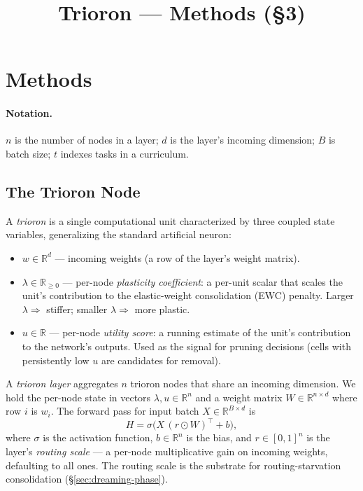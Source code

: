 \documentclass[11pt]{article}
\title{Trioron --- Methods (\S3)}
\author{}
\date{}
\newcommand{\R}{\mathbb{R}}
\begin{document}
\maketitle

\section{Methods}
\label{sec:methods}

\paragraph{Notation.}
$n$ is the number of nodes in a layer; $d$ is the layer's incoming
dimension; $B$ is batch size; $t$ indexes tasks in a curriculum.

\subsection{The Trioron Node}
\label{sec:trioron-node}

A \emph{trioron} is a single computational unit characterized by three
coupled state variables, generalizing the standard artificial neuron:

\begin{itemize}[leftmargin=1.5em]
  \item $w \in \R^{d}$ --- incoming weights (a row of the layer's weight
        matrix).
  \item $\lambda \in \R_{\geq 0}$ --- per-node \emph{plasticity coefficient}:
        a per-unit scalar that scales the unit's contribution to the
        elastic-weight consolidation (EWC) penalty. Larger
        $\lambda \Rightarrow$ stiffer; smaller $\lambda \Rightarrow$ more
        plastic.
  \item $u \in \R$ --- per-node \emph{utility score}: a running estimate
        of the unit's contribution to the network's outputs. Used as the
        signal for pruning decisions (cells with persistently low $u$ are
        candidates for removal).
\end{itemize}

A \emph{trioron layer} aggregates $n$ trioron nodes that share an incoming
dimension. We hold the per-node state in vectors $\lambda, u \in \R^{n}$
and a weight matrix $W \in \R^{n \times d}$ where row $i$ is $w_i$. The
forward pass for input batch $X \in \R^{B \times d}$ is
\begin{equation}
  H = \sigma\!\bigl(X\,(r \odot W)^{\top} + b\bigr),
\end{equation}
where $\sigma$ is the activation function, $b \in \R^{n}$ is the bias, and
$r \in [0, 1]^{n}$ is the layer's \emph{routing scale} --- a per-node
multiplicative gain on incoming weights, defaulting to all ones. The
routing scale is the substrate for routing-starvation consolidation
(\S\ref{sec:dreaming-phase}).
\end{document}
